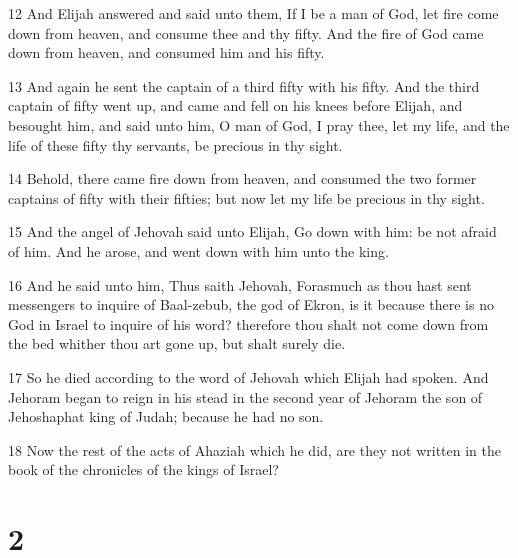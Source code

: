 \par 12 And Elijah answered and said unto them, If I be a man of God, let fire come down from heaven, and consume thee and thy fifty. And the fire of God came down from heaven, and consumed him and his fifty.
\par 13 And again he sent the captain of a third fifty with his fifty. And the third captain of fifty went up, and came and fell on his knees before Elijah, and besought him, and said unto him, O man of God, I pray thee, let my life, and the life of these fifty thy servants, be precious in thy sight.
\par 14 Behold, there came fire down from heaven, and consumed the two former captains of fifty with their fifties; but now let my life be precious in thy sight.
\par 15 And the angel of Jehovah said unto Elijah, Go down with him: be not afraid of him. And he arose, and went down with him unto the king.
\par 16 And he said unto him, Thus saith Jehovah, Forasmuch as thou hast sent messengers to inquire of Baal-zebub, the god of Ekron, is it because there is no God in Israel to inquire of his word? therefore thou shalt not come down from the bed whither thou art gone up, but shalt surely die.
\par 17 So he died according to the word of Jehovah which Elijah had spoken. And Jehoram began to reign in his stead in the second year of Jehoram the son of Jehoshaphat king of Judah; because he had no son.
\par 18 Now the rest of the acts of Ahaziah which he did, are they not written in the book of the chronicles of the kings of Israel?

\chapter{2}

